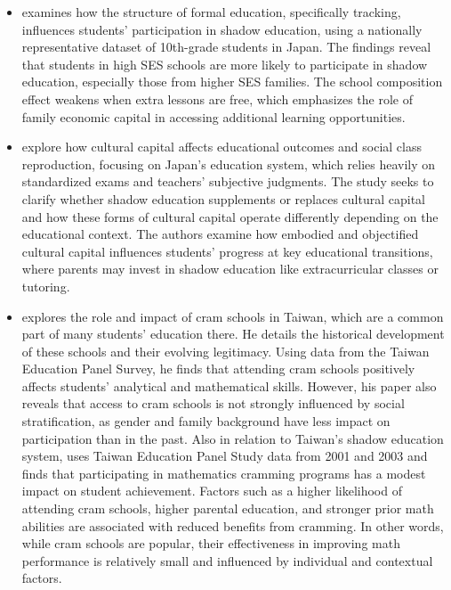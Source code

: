 \documentclass[12pt,a4paper,onecolumn]{article}
\numberwithin{equation}{section}
\begin{document}
\begin{itemize}
    \item \textcite{matsuoka2015school} examines how the structure of formal education, specifically tracking, influences students' participation in shadow education, using a nationally representative dataset of 10th-grade students in Japan. The findings reveal that students in high SES schools are more likely to participate in shadow education, especially those from higher SES families. The school composition effect weakens when extra lessons are free, which emphasizes the role of family economic capital in accessing additional learning opportunities. 
    \item \textcite{yamamoto2010cultural} explore how cultural capital affects educational outcomes and social class reproduction, focusing on Japan's education system, which relies heavily on standardized exams and teachers' subjective judgments. The study seeks to clarify whether shadow education supplements or replaces cultural capital and how these forms of cultural capital operate differently depending on the educational context. The authors examine how embodied and objectified cultural capital influences students' progress at key educational transitions, where parents may invest in shadow education like extracurricular classes or tutoring.
    \item \textcite{liu2012does} explores the role and impact of cram schools in Taiwan, which are a common part of many students' education there. He details the historical development of these schools and their evolving legitimacy. Using data from the Taiwan Education Panel Survey, he finds that attending cram schools positively affects students' analytical and mathematical skills. However, his paper also reveals that access to cram schools is not strongly influenced by social stratification, as gender and family background have less impact on participation than in the past. Also in relation to Taiwan's shadow education system, \textcite{liu2012does} uses Taiwan Education Panel Study data from 2001 and 2003 and finds that participating in mathematics cramming programs has a modest impact on student achievement. Factors such as a higher likelihood of attending cram schools, higher parental education, and stronger prior math abilities are associated with reduced benefits from cramming. In other words, while cram schools are popular, their effectiveness in improving math performance is relatively small and influenced by individual and contextual factors.
\end{itemize}
\end{document}
